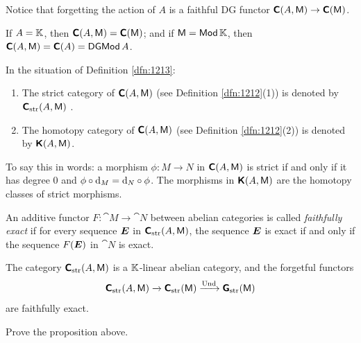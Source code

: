 Notice that forgetting the action of $A$ is a faithful DG
functor $\boldsymbol{\mathsf{C}}(A, \operatorname{\mathsf{M}}) \to \boldsymbol{\mathsf{C}}(\operatorname{\mathsf{M}})$.

\begin{exa} \label{exa:1820}
If $A = \mathbb{K}$, then $\boldsymbol{\mathsf{C}}(A, \operatorname{\mathsf{M}}) = \boldsymbol{\mathsf{C}}(\operatorname{\mathsf{M}})$; 
and if $\operatorname{\mathsf{M}} = \operatorname{\mathsf{Mod}} \mathbb{K}$, then 
$\boldsymbol{\mathsf{C}}(A, \operatorname{\mathsf{M}}) = \boldsymbol{\mathsf{C}}(A) = \operatorname{\mathsf{DGMod}} A$.
\end{exa}

\begin{dfn} \label{dfn:1132}
In the situation of Definition \ref{dfn:1213}:
\begin{enumerate}
\item The strict category of $\boldsymbol{\mathsf{C}}(A, \operatorname{\mathsf{M}})$%
(see Definition \ref{dfn:1212}(1)) is denoted by \lb 
$\boldsymbol{\mathsf{C}}_{\mathrm{str}}(A, \operatorname{\mathsf{M}})$%
.

\item The homotopy category of $\boldsymbol{\mathsf{C}}(A, \operatorname{\mathsf{M}})$%
%
(see Definition \ref{dfn:1212}(2)) is denoted by 
$\boldsymbol{\mathsf{K}}(A, \operatorname{\mathsf{M}})$.
\end{enumerate}
\end{dfn}

To say this in words: a morphism $\phi : M \to N$ in 
$\boldsymbol{\mathsf{C}}(A, \operatorname{\mathsf{M}})$ is strict if and only if it has degree $0$ and 
$\phi \circ \mathrm{d}_M = \mathrm{d}_N \circ \phi$. 
The morphisms in $\boldsymbol{\mathsf{K}}(A, \operatorname{\mathsf{M}})$ are the homotopy classes of strict 
morphisms. 

An additive functor $F : \cat{M} \to \cat{N}$ between abelian categories is 
called {\em faithfully exact} if for every sequence $\boldsymbol{E}$ in 
$\boldsymbol{\mathsf{C}}_{\mathrm{str}}(A, \operatorname{\mathsf{M}})$, the sequence $\boldsymbol{E}$ is exact if and 
only if the sequence $F(\boldsymbol{E})$ in $\cat{N}$ is exact.

\begin{prop} \label{prop:4130}
The category $\boldsymbol{\mathsf{C}}_{\mathrm{str}}(A, \operatorname{\mathsf{M}})$ is a $\mathbb{K}$-linear abelian 
category, and the forgetful functors 
\[ \boldsymbol{\mathsf{C}}_{\mathrm{str}}(A, \operatorname{\mathsf{M}}) \xrightarrow{} \boldsymbol{\mathsf{C}}_{\mathrm{str}}(\operatorname{\mathsf{M}}) 
\xrightarrow{\operatorname{Und}} \boldsymbol{\mathsf{G}}_{\mathrm{str}}(\operatorname{\mathsf{M}}) \]
are faithfully exact. 
\end{prop}

\begin{exer} \label{exer:4145}
Prove the proposition above. 
\end{exer}

